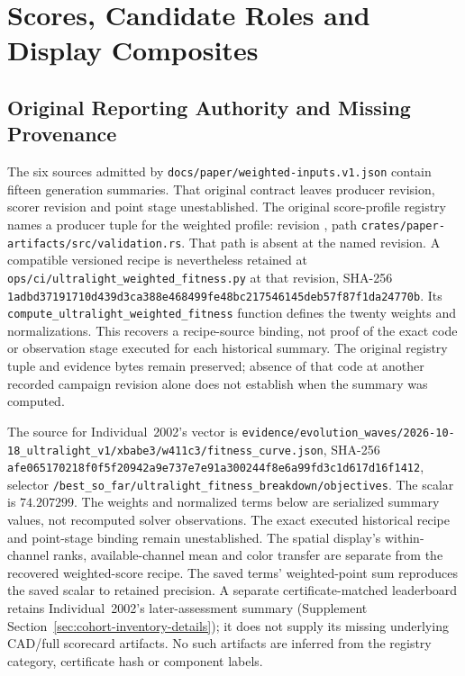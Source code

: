 \section{Scores, Candidate Roles and Display Composites}
\label{sec:score-composites-details}
\subsection{Original Reporting Authority and Missing Provenance}
The six sources admitted by \nolinkurl{docs/paper/weighted-inputs.v1.json} contain fifteen generation summaries. That original contract leaves producer revision, scorer revision and point stage unestablished. The original score-profile registry names a producer tuple for the weighted profile: revision , path \nolinkurl{crates/paper-artifacts/src/validation.rs}. That path is absent at the named revision. A compatible versioned recipe is nevertheless retained at \nolinkurl{ops/ci/ultralight_weighted_fitness.py} at that revision, SHA-256 \nolinkurl{1adbd37191710d439d3ca388e468499fe48bc217546145deb57f87f1da24770b}. Its \nolinkurl{compute_ultralight_weighted_fitness} function defines the twenty weights and normalizations. This recovers a recipe-source binding, not proof of the exact code or observation stage executed for each historical summary. The original registry tuple and evidence bytes remain preserved; absence of that code at another recorded campaign revision alone does not establish when the summary was computed.

The source for Individual~2002's vector is \nolinkurl{evidence/evolution_waves/2026-10-18_ultralight_v1/xbabe3/w411c3/fitness_curve.json}, SHA-256 \nolinkurl{afe065170218f0f5f20942a9e737e7e91a300244f8e6a99fd3c1d617d16f1412}, selector \nolinkurl{/best_so_far/ultralight_fitness_breakdown/objectives}. The scalar is $74.207299$. The weights and normalized terms below are serialized summary values, not recomputed solver observations. The exact executed historical recipe and point-stage binding remain unestablished. The spatial display's within-channel ranks, available-channel mean and color transfer are separate from the recovered weighted-score recipe. The saved terms' weighted-point sum reproduces the saved scalar to retained precision. A separate certificate-matched leaderboard retains Individual~2002's later-assessment summary (Supplement Section~\ref{sec:cohort-inventory-details}); it does not supply its missing underlying CAD/full scorecard artifacts. No such artifacts are inferred from the registry category, certificate hash or component labels.

